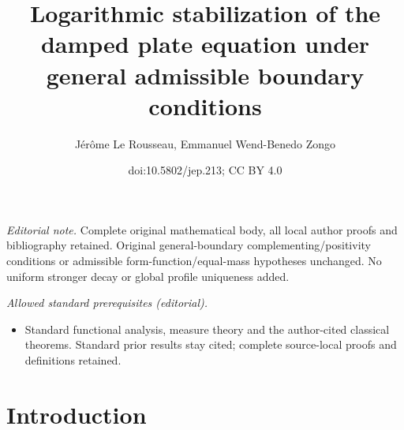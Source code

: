 \documentclass[10pt]{amsart}
\title{Logarithmic stabilization of the damped plate equation under general admissible boundary conditions}
\author{Jérôme Le Rousseau, Emmanuel Wend-Benedo Zongo}
\date{doi:10.5802/jep.213; CC BY 4.0}
\theoremstyle{plain}
\theoremstyle{definition}
\begin{document}
\maketitle
\noindent\textit{Editorial note.} Complete original mathematical body, all local author proofs and bibliography retained. Original general-boundary complementing/positivity conditions or admissible form-function/equal-mass hypotheses unchanged. No uniform stronger decay or global profile uniqueness added.\par\medskip
\noindent\textit{Allowed standard prerequisites (editorial).}\begin{itemize}
\item Standard functional analysis, measure theory and the author-cited classical theorems. Standard prior results stay cited; complete source-local proofs and definitions retained.
\end{itemize}\medskip
\vspace*{-\baselineskip}
\tableofcontents


\section{Introduction}
\end{document}
